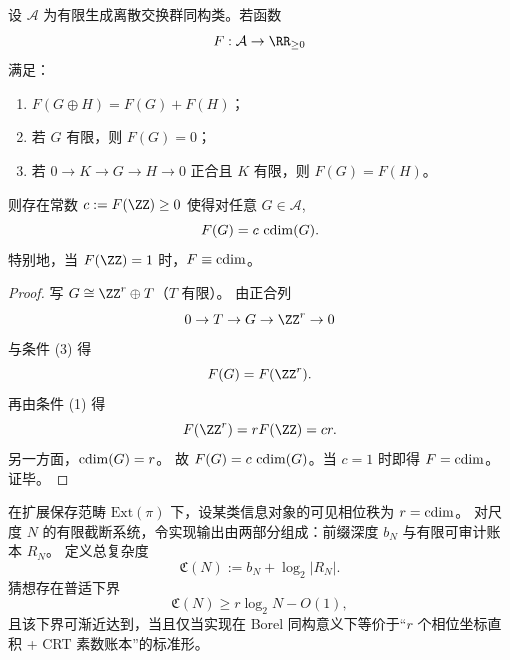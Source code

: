 \begin{proposition}[有限扩张不计费语义下的圆维唯一性]\label{prop:cdim-finite-extension-axiomatic-uniqueness}
设 \(\mathcal A\) 为有限生成离散交换群同构类。若函数
\[
F:\mathcal A\to\RR_{\ge 0}
\]
满足：
\begin{enumerate}
  \item \(F(G\oplus H)=F(G)+F(H)\)；
  \item 若 \(G\) 有限，则 \(F(G)=0\)；
  \item 若 \(0\to K\to G\to H\to 0\) 正合且 \(K\) 有限，则 \(F(G)=F(H)\)。
\end{enumerate}
则存在常数 \(c:=F(\ZZ)\ge 0\) 使得对任意 \(G\in\mathcal A\),
\[
F(G)=c\,\operatorname{cdim}(G).
\]
特别地，当 \(F(\ZZ)=1\) 时，\(F\equiv \operatorname{cdim}\)。
\end{proposition}
\begin{proof}
写 \(G\cong\ZZ^r\oplus T\)（\(T\) 有限）。
由正合列
\[
0\to T\to G\to \ZZ^r\to 0
\]
与条件 (3) 得
\[
F(G)=F(\ZZ^r).
\]
再由条件 (1) 得
\[
F(\ZZ^r)=rF(\ZZ)=cr.
\]
另一方面，\(\operatorname{cdim}(G)=r\)。
故 \(F(G)=c\,\operatorname{cdim}(G)\)。当 \(c=1\) 时即得 \(F=\operatorname{cdim}\)。证毕。
\end{proof}

\begin{conjecture}[圆维--账本守恒的可测最优性]\label{conj:cdim-measurable-prefix-ledger-optimality}
在扩展保存范畴 \(\mathrm{Ext}(\pi)\) 下，设某类信息对象的可见相位秩为 \(r=\operatorname{cdim}\)。
对尺度 \(N\) 的有限截断系统，令实现输出由两部分组成：前缀深度 \(b_N\) 与有限可审计账本 \(R_N\)。
定义总复杂度
\[
\mathfrak C(N):=b_N+\log_2|R_N|.
\]
猜想存在普适下界
\[
\mathfrak C(N)\ge r\log_2 N-O(1),
\]
且该下界可渐近达到，当且仅当实现在 Borel 同构意义下等价于“\(r\) 个相位坐标直积 + CRT 素数账本”的标准形。
\end{conjecture}

\endinput

